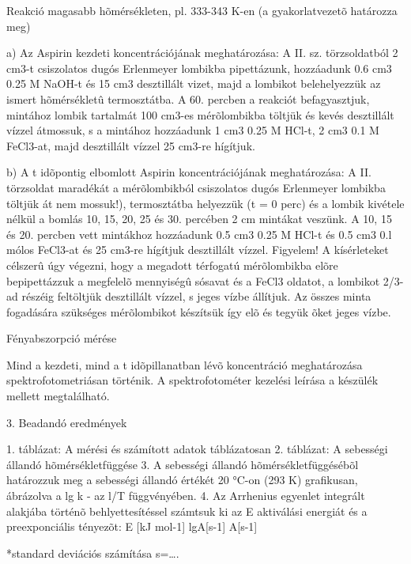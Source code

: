 \documentclass[a4paper, 12pt]{article}
\begin{document}
Reakció magasabb hõmérsékleten, pl. 333-343 K-en (a gyakorlatvezetõ határozza meg)


a) Az Aspirin kezdeti koncentrációjának meghatározása:
A II. sz. törzsoldatból 2 cm3-t csiszolatos dugós Erlenmeyer lombikba pipettázunk, hozzáadunk 0.6 cm3 0.25 M NaOH-t és 15 cm3 desztillált vizet, majd a lombikot belehelyezzük az ismert hõmérsékletû termosztátba.
A 60. percben a reakciót befagyasztjuk, mintához lombik tartalmát 100 cm3-es mérõlombikba töltjük és kevés desztillált vízzel átmossuk, s a mintához hozzáadunk 1 cm3 0.25 M HCl-t, 2 cm3 0.1 M FeCl3-at, majd desztillált vízzel 25 cm3-re hígítjuk.

b) A t idõpontig elbomlott Aspirin koncentrációjának meghatározása:
A II. törzsoldat maradékát a mérõlombikból csiszolatos dugós Erlenmeyer lombikba töltjük át nem mossuk!), termosztátba helyezzük (t = 0 perc) és a lombik kivétele nélkül a bomlás 10, 15, 20, 25 és 30. percében 2 cm mintákat veszünk.
A 10, 15 és 20. percben vett mintákhoz hozzáadunk 0.5 cm3 0.25 M HCl-t és 0.5 cm3 0.l mólos FeCl3-at és 25 cm3-re hígítjuk desztillált vízzel.
Figyelem!
A kísérleteket célszerû úgy végezni, hogy a megadott térfogatú mérõlombikba elõre bepipettázzuk a megfelelõ mennyiségû sósavat és a FeCl3 oldatot, a lombikot 2/3-ad részéig feltöltjük desztillált vízzel, s jeges vízbe állítjuk. 
Az összes minta fogadására szükséges mérõlombikot készítsük így elõ és tegyük õket jeges vízbe.


Fényabszorpció mérése


Mind a kezdeti, mind a t idõpillanatban lévõ koncentráció meghatározása spektrofotometriásan történik.
A spektrofotométer kezelési leírása a készülék mellett megtalálható.


3. Beadandó eredmények

1. táblázat: A mérési és számított adatok táblázatosan
2. táblázat: A sebességi állandó hõmérsékletfüggése
3. A sebességi állandó hõmérsékletfüggésébõl határozzuk meg a sebességi állandó értékét 20 °C-on (293 K) grafikusan, ábrázolva a lg k - az l/T függvényében.
4. Az Arrhenius egyenlet integrált alakjába történõ behlyettesítéssel számtsuk ki az E aktiválási energiát és a preexponciális tényezõt:
E [kJ mol-1]
lgA[s-1]
A[s-1]

*standard deviációs számítása
s=….
\end{document}
